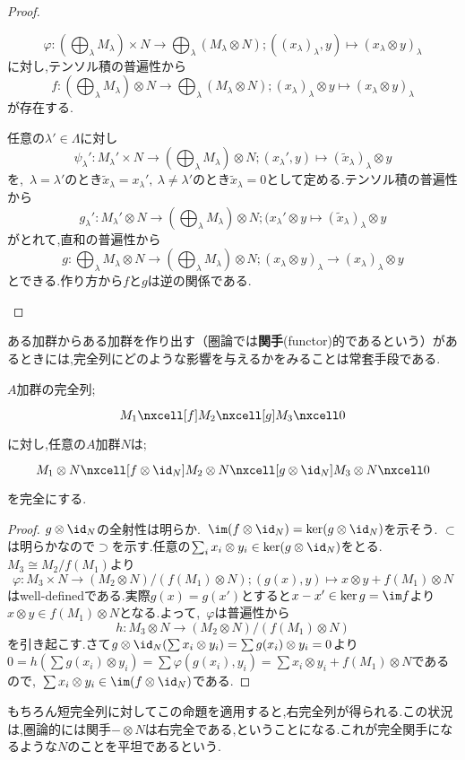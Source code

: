 \begin{proof}
\begin{step}
	\begin{mrkw}
		\item \[\varphi:\left(\bigoplus_\lambda M_\lambda\right)\times N\to\bigoplus_\lambda(M_\lambda\otimes N);((x_\lambda)_\lambda,y)\mapsto(x_\lambda\otimes y)_\lambda\]
		に対し,テンソル積の普遍性から
		\[f:\left(\bigoplus_\lambda M_\lambda\right)\otimes N\to \bigoplus_\lambda(M_\lambda\otimes N);(x_\lambda)_\lambda\otimes y\mapsto(x_\lambda\otimes y)_\lambda\]
		が存在する.
		\item 任意の$\lambda'\in\Lambda$に対し
		\[\psi_\lambda':M_\lambda'\times N\to\left(\bigoplus_\lambda M_\lambda\right)\otimes N;(x_\lambda',y)\mapsto(\tilde{x}_\lambda)_\lambda\otimes y\]
		を,~$\lambda=\lambda'$のとき$\tilde{x}_\lambda=x_\lambda',~\lambda\neq\lambda'$のとき$\tilde{x}_\lambda=0$として定める.テンソル積の普遍性から
		\[g_\lambda':M_\lambda'\otimes N\to\left(\bigoplus_\lambda M_\lambda\right)\otimes N;(x_\lambda'\otimes y\mapsto(\tilde{x}_\lambda)_\lambda\otimes y\]
		がとれて,直和の普遍性から
		\[g:\bigoplus_\lambda M_\lambda\otimes N\to \left(\bigoplus_\lambda M_\lambda\right)\otimes N;(x_\lambda\otimes y)_\lambda\to(x_\lambda)_\lambda\otimes y\]
		とできる.作り方から$f$と$g$は逆の関係である.
	\end{mrkw}
	\end{step}
\end{proof}

ある加群からある加群を作り出す（圏論では\textbf{関手}(functor)的であるという）があるときには,完全列にどのような影響を与えるかをみることは常套手段である.

\begin{prop}[テンソル積の右完全性]
	$A$加群の完全列;
	\[\begin{tikzcd}
	M_1\nxcell[f]M_2\nxcell[g]M_3\nxcell0
	\end{tikzcd}\]
	に対し,任意の$A$加群$N$は;
	\[\begin{tikzcd}
	M_1\otimes N\nxcell[f\otimes\id_{N}]M_2\otimes N\nxcell[g\otimes\id_{N}]M_3\otimes N\nxcell0
	\end{tikzcd}\]
	を完全にする.
\end{prop}
\begin{proof}
	$g\otimes\id_{N}$の全射性は明らか.~$\im(f\otimes\id_{N})=\ker(g\otimes\id_{N})$を示そう. $\subset$は明らかなので$\supset$を示す.任意の$\sum_i x_i\otimes y_i\in\ker(g\otimes\id_{N})$をとる.~$M_3\cong M_2/f(M_1)$より
	\[\varphi:M_3\times N\to (M_2\otimes N)/(f(M_1)\otimes N);(g(x),y)\mapsto x\otimes y+f(M_1)\otimes N\]
	はwell-definedである.実際$g(x)=g(x')$とすると$x-x'\in\ker g=\im f$より$x\otimes y\in f(M_1)\otimes N$となる.よって,~$\varphi$は普遍性から
	\[h:M_3\otimes N\to(M_2\otimes N)/(f(M_1)\otimes N)\]
	を引き起こす.さて$g\otimes\id_{N}(\sum x_i\otimes y_i)=\sum g(x_i)\otimes y_i=0$より$0=h(\sum g(x_i)\otimes y_i)=\sum \varphi(g(x_i),y_i)=\sum x_i\otimes y_i+f(M_1)\otimes N$であるので,~$\sum x_i\otimes y_i\in\im(f\otimes\id_{N})$である.
\end{proof}
もちろん短完全列に対してこの命題を適用すると,右完全列が得られる.この状況は,圏論的には関手$-\otimes N$は右完全である,ということになる.これが完全関手になるような$N$のことを平坦であるという.

